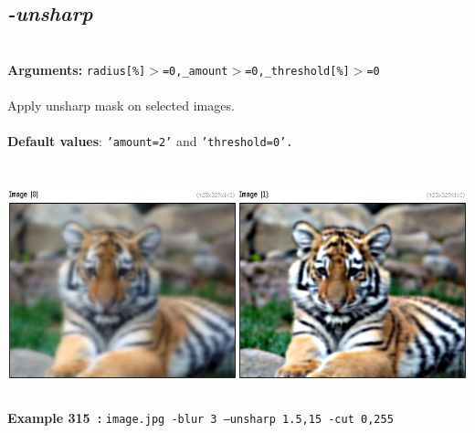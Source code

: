 \documentclass[a4paper,11pt,twoside]{book}
\begin{document}
\subsection{\emph{-unsharp} }\vspace*{-0.5em}
~\\\textbf{Arguments: } 
{\small \texttt{radius[\%]$>$=0,\_amount$>$=0,\_threshold[\%]$>$=0}}\\~\\
Apply unsharp mask on selected images.
~\\~\\\textbf{Default values}: {\small \texttt{'amount=2'} and \texttt{'threshold=0'.}}
\begin{center}\includegraphics[keepaspectratio=true,height=7cm,width=\textwidth]{img/gmic_def315.jpg}\\
{\footnotesize \textbf{Example 315~:} \texttt{image.jpg -blur 3 --unsharp 1.5,15 -cut 0,255}}
\end{center}
\end{document}
